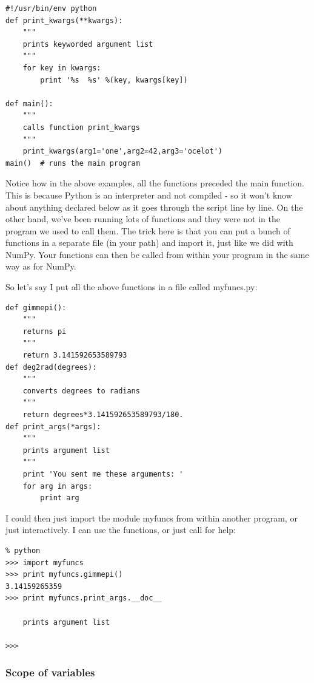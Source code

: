 \documentclass[11pt]{book}
\begin{document}
{{{{ \color{blue} \begin{verbatim}
#!/usr/bin/env python
def print_kwargs(**kwargs):
    """
    prints keyworded argument list
    """
    for key in kwargs:
        print '%s  %s' %(key, kwargs[key])
     
def main():
    """
    calls function print_kwargs
    """
    print_kwargs(arg1='one',arg2=42,arg3='ocelot')
main()  # runs the main program
\end{verbatim}}

Notice how in the above examples, all the functions preceded the main function.  This is because Python is an interpreter and not compiled - so it won't know about anything declared below as it goes through the script line by line.   On the other hand, we've been running lots of functions and they were not in the program we used to call them.  The trick here is that 
you can put a bunch of functions in a separate file (in your path) and import it, just like we did with {\color{blue}NumPy}.  Your functions can then be called from within your program  in the same way as for {\color{blue}NumPy}.  

So let's say I put all the above functions in a file called {\color{blue}myfuncs.py}:

{ \color{blue} \begin{verbatim}
def gimmepi():  
    """
    returns pi
    """
    return 3.141592653589793
def deg2rad(degrees):  
    """
    converts degrees to radians
    """
    return degrees*3.141592653589793/180.
def print_args(*args):
    """
    prints argument list
    """
    print 'You sent me these arguments: '
    for arg in args:
        print arg
\end{verbatim}}

\noindent I could then just import the module {\color{blue}myfuncs} from within another program, or just interactively.  I can use the functions, or just call for help:

{ \color{blue} \begin{verbatim}
% python
>>> import myfuncs
>>> print myfuncs.gimmepi()
3.14159265359
>>> print myfuncs.print_args.__doc__

    prints argument list

>>>
\end{verbatim}}

\subsubsection{Scope of variables}

}}}
\end{document}
